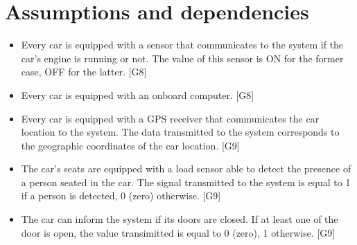 \section{Assumptions and dependencies}

\begin{itemize}
	\item Every car is equipped with a sensor that communicates to the system if the car's engine is running or not. The value of this sensor is ON for the former case, OFF for the latter. [G8]
	\item Every car is equipped with an onboard computer. [G8]
	\item Every car is equipped with a GPS receiver that communicates the car location to the system. The data transmitted to the system corresponds to the geographic coordinates of the car location. [G9]
	\item The car's seats are equipped with a load sensor able to detect the presence of a person seated in the car. The signal transmitted to the system is equal to 1 if a person is detected, 0 (zero) otherwise. [G9]
	\item The car can inform the system if its doors are closed. If at least one of the door is open, the value transimitted is equal to 0 (zero), 1 otherwise. [G9]
\end{itemize}